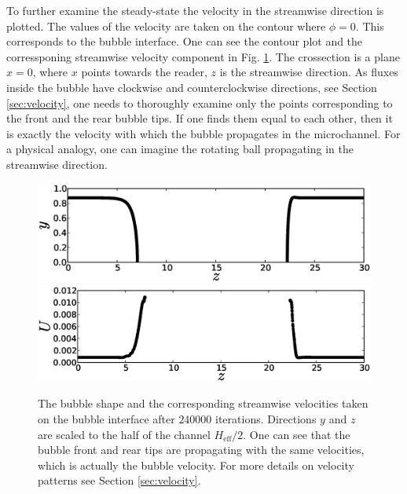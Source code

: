 \documentclass{article}
\begin{document}
To further examine the steady-state the velocity in the streamwise direction is plotted. The values
of the velocity are taken on the contour where $\phi=0$. This corresponds
 to the bubble interface. One can see the contour plot and the corressponing streamwise velocity
component in Fig. \ref{fig:velocity:contour}. The crossection is a plane $x=0$, where $x$ points
towards the reader, $z$ is the streamwise direction. As fluxes inside the bubble have
clockwise and counterclockwise directions, see Section \ref{sec:velocity}, one needs to thoroughly
examine only the points corresponding to the front and the rear bubble tips. If one finds them equal
to each other, then it is exactly the velocity with which the bubble propagates in the microchannel.
For a physical analogy, one can imagine the rotating ball propagating in the streamwise direction. 
\begin{figure}[ht]
\includegraphics[width=\textwidth]{Figures/velocity_interface_contour.eps}\\
\includegraphics[width=\textwidth]{Figures/velocity_interface_values.eps}\\
\caption{The bubble shape and the corresponding streamwise velocities taken on the bubble
interface after $240000$ iterations. Directions $y$ and $z$ are scaled to the half of the channel
$H_{\mathrm{eff}}/2$. One can see that the bubble front and rear tips are propagating with the
same velocities, which is actually the bubble velocity. For more details on velocity patterns
see Section \ref{sec:velocity}. \label{fig:velocity:contour}}
\end{figure}
\end{document}
